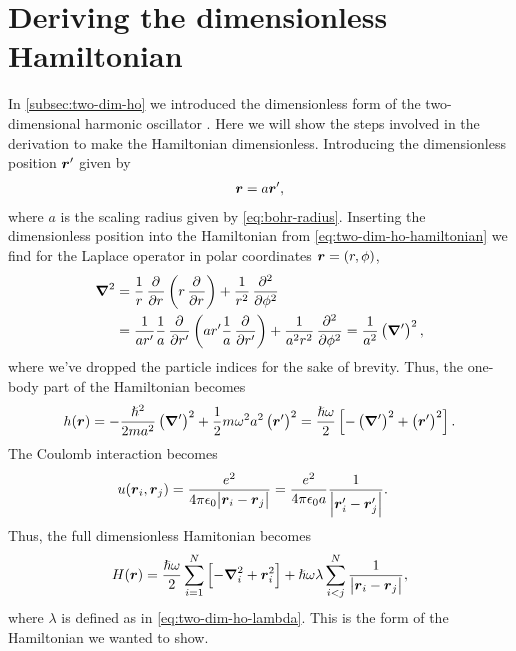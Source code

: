     \section{Deriving the dimensionless Hamiltonian}
        \label{app:two-dim-ho-dimensionless}
        In \autoref{subsec:two-dim-ho} we introduced the dimensionless form of
        the two-dimensional harmonic oscillator \cite{anisimovas1998energy}.
        Here we will show the steps involved in the derivation to make the
        Hamiltonian dimensionless.
        Introducing the dimensionless position $\boldsymbol{r}'$ given by
        \begin{align}
            \boldsymbol{r} = a \boldsymbol{r}',
        \end{align}
        where $a$ is the scaling radius given by \autoref{eq:bohr-radius}.
        Inserting the dimensionless position into the Hamiltonian from
        \autoref{eq:two-dim-ho-hamiltonian} we find for the Laplace operator in
        polar coordinates $\boldsymbol{r} = (r, \phi)$,
        \begin{align}
            \vfg{\nabla}^2
            &= \frac{1}{r}\dpd{}{r}\para{
                r\dpd{}{r}
            }
            + \frac{1}{r^2}\dpd[2]{}{\phi}
            \\
            &= \frac{1}{a r'}\frac{1}{a}\dpd{}{r'}\para{
                a r' \frac{1}{a}\dpd{}{r'}
            }
            + \frac{1}{a^2 r^2}\dpd[2]{}{\phi}
            = \frac{1}{a^2}\para{\vfg{\nabla}'}^2,
        \end{align}
        where we've dropped the particle indices for the sake of brevity.
        Thus, the one-body part of the Hamiltonian becomes
        \begin{align}
            h(\boldsymbol{r})
            = -\frac{\hslash^2}{2m a^2}\left( \boldsymbol{\nabla}' \right)^2
            + \frac{1}{2} m \omega^2 a^2 \left( \boldsymbol{r}' \right)^2
            = \frac{\hslash\omega}{2}\left[ 
                -\left( \boldsymbol{\nabla}' \right)^2
                + \left( \boldsymbol{r}' \right)^2
             \right].
        \end{align}
        The Coulomb interaction becomes
        \begin{align}
            u(\boldsymbol{r}_i, \boldsymbol{r}_j)
            &= \frac{e^2}{4\pi\epsilon_0 \abs{\boldsymbol{r}_i - \boldsymbol{r}_j}}
            = \frac{e^2}{4\pi \epsilon_0 a}
            \frac{1}{\abs{\boldsymbol{r}_i' - \boldsymbol{r}_j'}}.
        \end{align}
        Thus, the full dimensionless Hamitonian becomes
        \begin{align}
            H(\boldsymbol{r})
            = \frac{\hslash\omega}{2} \sum_{i = 1}^{N}\left[ 
                -\boldsymbol{\nabla}^2_i
                + \boldsymbol{r}^2_i
             \right]
            + \hslash \omega \lambda
            \sum_{i < j}^{N} \frac{1}{\abs{\boldsymbol{r}_i - \boldsymbol{r}_j}},
        \end{align}
        where $\lambda$ is defined as in \autoref{eq:two-dim-ho-lambda}.
        This is the form of the Hamiltonian we wanted to show.

